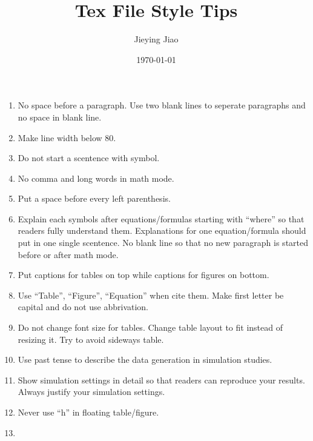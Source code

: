 \documentclass[12pt, letterpaper]{article}
\title{Tex File Style Tips}
\author{Jieying Jiao}
\date{\today}
\begin{document}
\maketitle
\begin{enumerate}
    \item No space before a paragraph. Use two blank lines to seperate paragraphs 
    and no space in blank line.
    \item Make line width below 80. 
    \item Do not start a scentence with symbol.
    \item No comma and long words in math mode.
    \item Put a space before every left parenthesis.
    \item Explain each symbols after equations/formulas starting with ``where'' 
    so that readers fully understand them. Explanations for one equation/formula 
    should put in one single scentence. No blank line so that no new paragraph 
    is started before or after math mode.
    \item Put captions for tables on top while captions for figures on bottom.
    \item Use ``Table'', ``Figure'', ``Equation'' when cite them. Make first letter 
    be capital and do not use abbrivation.
    \item Do not change font size for tables. Change table layout to fit instead 
    of resizing it. Try to avoid sideways table.
    \item Use past tense to describe the data generation in simulation studies.
    \item Show simulation settings in detail so that readers can reproduce your 
    results. Always justify your simulation settings.
    \item Never use ``h'' in floating table/figure.
    \item 
\end{enumerate}
\end{document}
